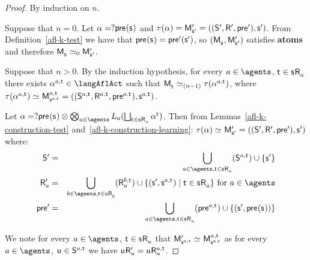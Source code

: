\begin{proof}
By induction on $n$.

Suppose that $n = 0$.
Let $\alpha = \test{\aPrecondition(\aStateS)}$ and $\tau(\alpha) = \aPModelP{\aStateSP} = \aPModelTupleP{\aStateSP}$.
From Definition~\ref{afl-k-test} we have that $\aPrecondition(\aStateS) = \aPreconditionP(\aStateSP)$, so $(\aPModel{\aStateS}, \aPModelP{\aStateSP})$ satisfies {\bf atoms} and therefore $\aPModel{\aStateS} \bisimilar[0] \aPModelP{\aStateSP}$.

Suppose that $n > 0$. 
By the induction hypothesis, for every $\agentA \in \agents$, $\aStateT \in \aStateS \aAccessibility{\agentA}$ there exists $\alpha^{\agentA,\aStateT} \in \langAflAct$ such that $\aPModel{\aStateT} \bisimilar[(n - 1)] \tau(\alpha^{\agentA,\aStateT})$, where $\tau(\alpha^{\agentA,\aStateT}) \bisimilar \aPModel[\agentA,\aStateT]{\aStateS[\agentA,\aStateT]} = \aPModelTuple[\agentA,\aStateT]{\aStateS[\agentA,\aStateT]}$.

Let $\alpha = \test{\aPrecondition(\aStateS)} \compose \bigcompose_{\agentA \in \agents} \learns_\agentA (\bigchoice_{\aStateT \in \aStateS \aAccessibility{\agentA}} \alpha^{\aStateT})$. 
Then from Lemmas~\ref{afl-k-construction-test} and~\ref{afl-k-construction-learning}: $\tau(\alpha) \bisimilar \aPModelP{\aStateSP} = \aPModelTupleP{\aStateSP}$ where:
\begin{eqnarray*}
    \aStatesP &=& \bigcup_{\agentA \in \agents, \aStateT \in \aStateS \aAccessibility{\agentA}} (\aStates[\agentA,\aStateT]) \cup \{\aStateSP\}\\
    \aAccessibilityP{\agentA} &=& \bigcup_{\agentB \in \agents, \aStateT \in \aStateS \aAccessibility{\agentB}} (\aAccessibility[\agentB,\aStateT]{\agentA}) \cup \{(\aStateSP, \aStateS[\agentA,\aStateT]) \mid \aStateT \in \aStateS \aAccessibility{\agentA}\} \text{ for } \agentA \in \agents\\
    \aPreconditionP &=& \bigcup_{\agentA \in \agents, \aStateT \in \aStateS \aAccessibility{\agentA}} (\aPrecondition[\agentA,\aStateT]) \cup \{(\aStateSP, \aPrecondition(\aStateS))\}
\end{eqnarray*}

We note for every $\agentA \in \agents$, $\aStateT \in \aStateS \aAccessibility{\agentA}$ that $\aPModelP{\aStateS[\agentA,\aStateT]} \bisimilar \aPModel[\agentA,\aStateT]{\aStateS[\agentA,\aStateT]}$ as for every $\agentA \in \agents$, $\aStateU \in \aStates[\agentA,\aStateT]$ we have $\aStateU \aAccessibilityP{\agentA} = \aStateU \aAccessibility[\agentA,\aStateT]{\agentA}$.


\end{proof}
